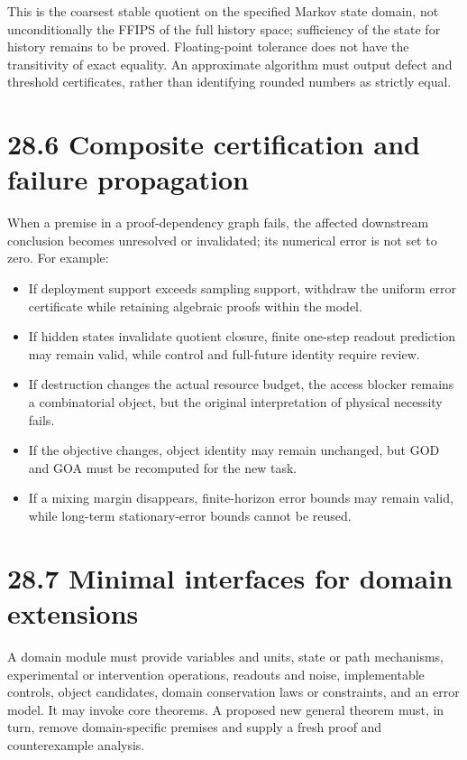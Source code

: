 \documentclass[
  english,
  11pt,
  oneside]{book}
\providecommand{\tightlist}{%
  \setlength{\itemsep}{0pt}\setlength{\parskip}{0pt}}
\begin{document}
This is the coarsest stable quotient on the specified Markov state domain, not unconditionally the FFIPS of the full history space; sufficiency of the state for history remains to be proved. Floating-point tolerance does not have the transitivity of exact equality. An approximate algorithm must output defect and threshold certificates, rather than identifying rounded numbers as strictly equal.

\section{28.6 Composite certification and failure propagation}\label{composite-certification-and-failure-propagation}

When a premise in a proof-dependency graph fails, the affected downstream conclusion becomes unresolved or invalidated; its numerical error is not set to zero. For example:

\begin{itemize}
\tightlist
\item
  If deployment support exceeds sampling support, withdraw the uniform error certificate while retaining algebraic proofs within the model.
\item
  If hidden states invalidate quotient closure, finite one-step readout prediction may remain valid, while control and full-future identity require review.
\item
  If destruction changes the actual resource budget, the access blocker remains a combinatorial object, but the original interpretation of physical necessity fails.
\item
  If the objective changes, object identity may remain unchanged, but GOD and GOA must be recomputed for the new task.
\item
  If a mixing margin disappears, finite-horizon error bounds may remain valid, while long-term stationary-error bounds cannot be reused.
\end{itemize}

\section{28.7 Minimal interfaces for domain extensions}\label{minimal-interfaces-for-domain-extensions}

A domain module must provide variables and units, state or path mechanisms, experimental or intervention operations, readouts and noise, implementable controls, object candidates, domain conservation laws or constraints, and an error model. It may invoke core theorems. A proposed new general theorem must, in turn, remove domain-specific premises and supply a fresh proof and counterexample analysis.
\end{document}
